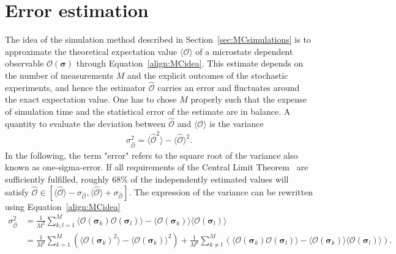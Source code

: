 

\section{Error estimation}
\label{sec:error}

The idea of the simulation method described in Section~\ref{sec:MCsimulations} is to approximate the theoretical expectation value
$\langle \mathcal{O} \rangle$ of a microstate dependent observable $\mathcal{O}(\bm{\sigma})$ through Equation~\eqref{align:MCidea}. This estimate
depends on the number of measurements $M$ and the explicit outcomes of the stochastic experiments, and hence the estimator $\hat{\mathcal{O}}$ carries an error 
and fluctuates around the exact expectation value. One has to chose $M$ properly such that the expense of simulation time and the statistical error of the estimate 
are in balance. A 
quantity to evaluate the deviation between $\hat{\mathcal{O}}$ and $\langle \mathcal{O} \rangle$ is the variance 
\begin{align*}
    \sigma_{\hat{\mathcal{O}}}^2 = \langle \hat{\mathcal{O}}^2\rangle-\langle \hat{\mathcal{O}} \rangle^2.
\end{align*}
In the following, the term "error" refers to the square root of the variance also known as one-sigma-error. If all requirements of
the Central Limit Theorem~\cite[p.246]{Behrends2013} are sufficiently fulfilled, roughly $68\%$ of the independently estimated values will satisfy
$\hat{\mathcal{O}}\!\in\![\langle \hat{\mathcal{O}} \rangle\!-\!\sigma_{\hat{\mathcal{O}}},\langle \hat{\mathcal{O}} \rangle\!+\!\sigma_{\hat{\mathcal{O}}}]$.
The expression of the variance can be rewritten using Equation~\eqref{align:MCidea}
\begin{align*}
    \sigma_{\hat{\mathcal{O}}}^2 %
                                 &= \frac{1}{M^2}\sum_{k,l=1}^M \langle \mathcal{O}(\bm{\sigma}_k)\mathcal{O}(\bm{\sigma}_l) \rangle 
                                    - \langle \mathcal{O}(\bm{\sigma}_k) \rangle\langle \mathcal{O}(\bm{\sigma}_l) \rangle\\
                                 &= \frac{1}{M^2}\!\sum_{k=1}^M\!\left( \langle \mathcal{O}(\bm{\sigma}_k)^2 \rangle \!\!-\!\! \langle \mathcal{O}(\bm{\sigma}_k) \rangle^2 \right)
                                    \!+\! \frac{1}{M^2}\!\sum_{k\neq l}^M \!\left( \langle \mathcal{O}(\bm{\sigma}_k)\mathcal{O}(\bm{\sigma}_l) \rangle \!\!-\!\! \langle \mathcal{O}(\bm{\sigma}_k) \rangle\langle \mathcal{O}(\bm{\sigma}_l) \rangle \right).
\end{align*}
